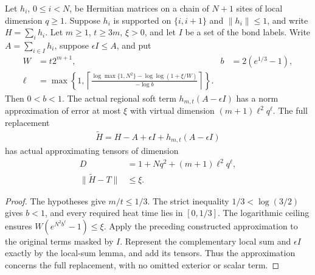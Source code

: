 \begin{theorem}
    \label{thm:soft_hamiltonian_mpo_accuracy}
    \leanok

    Let $h_i$, $0\leq i<N$, be Hermitian matrices on a chain of
    $N+1$ sites of local dimension $q\geq1$. Suppose $h_i$ is supported
    on $\{i,i+1\}$ and $\|h_i\|\leq1$, and write $H=\sum_i h_i$.
    Let $m\geq1$, $t\geq3m$, $\xi>0$, and let $I$ be a set of the
    bond labels. Write $A=\sum_{i\in I}h_i$, suppose
    $\epsilon I\leq A$, and put
    \begin{align}
        W    & =t2^{m+1},     & b & =2(e^{1/3}-1), \\
        \ell & =\max\left\{1,
        \left\lceil\frac{\log\max\{1,N^2\}
            -\log\log(1+\xi/W)}{-\log b}\right\rceil\right\}.
        \label{eq:soft_interval_cluster_order}
    \end{align}
    Then $0<b<1$. The actual regional soft term $h_{m,t}(A-\epsilon I)$
    has a norm approximation of error at most $\xi$ with virtual
    dimension $(m+1)\ell^2q^\ell$. The full replacement
    \begin{align}
        \widetilde H=H-A+\epsilon I+h_{m,t}(A-\epsilon I)
        \label{eq:soft_interval_full_operator}
    \end{align}
    has actual approximating tensors of dimension
    \begin{align}
        D                  & =1+Nq^2+(m+1)\ell^2q^\ell,
        \label{eq:soft_interval_bond}                   \\
        \|\widetilde H-T\| & \leq\xi.
        \label{eq:soft_interval_full_error}
    \end{align}
\end{theorem}
\begin{proof}\leanok
    The hypotheses give $m/t\leq1/3$. The strict inequality
    $1/3<\log(3/2)$ gives $b<1$, and every required heat time
    lies in $[0,1/3]$.
    The logarithmic ceiling ensures
    $W(e^{N^2b^\ell}-1)\leq\xi$. Apply the preceding constructed
    approximation to the original terms masked by $I$.
    Represent the complementary local sum and $\epsilon I$ exactly
    by the local-sum lemma, and add its tensors. Thus the
    approximation concerns the full replacement, with no omitted
    exterior or scalar term.
\end{proof}

